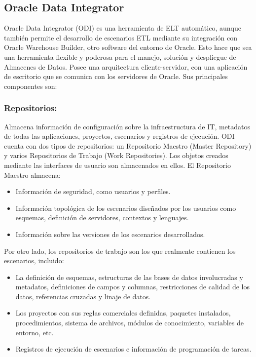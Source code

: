 \subsection{Oracle Data Integrator}

Oracle Data Integrator (ODI) es una herramienta de ELT automático, aunque también permite el desarrollo de escenarios 
ETL mediante su integración con Oracle Warehouse Builder, otro software del entorno de Oracle. Esto hace que sea una 
herramienta flexible y poderosa para el manejo, solución y despliegue de Almacenes de Datos. Posee una arquitectura 
cliente-servidor, con una aplicación de escritorio que se comunica con los servidores de Oracle. Sus principales 
componentes son: 

\subsubsection{Repositorios:} 
Almacena información de configuración sobre la infraestructura de IT, metadatos de todas las aplicaciones, proyectos, 
escenarios y registros de ejecución. ODI cuenta con dos tipos de repositorios: un Repositorio Maestro (Master Repository) 
y varios Repositorios de Trabajo (Work Repositories). Los objetos creados mediante las interfaces de usuario son almacenados 
en ellos. El Repositorio Maestro almacena:

\begin{itemize}
    \item Información de seguridad, como usuarios y perfiles.
    \item Información topológica de los escenarios diseñados por los usuarios como esquemas, definición de servidores, 
        contextos y lenguajes.
    \item Información sobre las versiones de los escenarios desarrollados.
\end{itemize}

Por otro lado, los repositorios de trabajo son los que realmente 
contienen los escenarios, incluido: 

\begin{itemize}
    \item La definición de esquemas, estructuras de las bases de datos involucradas y metadatos, 
        definiciones de campos y columnas, restricciones de calidad de los datos, referencias cruzadas y linaje de datos.
    \item Los proyectos con sus reglas comerciales definidas, paquetes instalados, procedimientos, 
        sistema de archivos, módulos de conocimiento, variables de entorno, etc.
    \item Registros de ejecución de escenarios e información de programación de tareas.
\end{itemize}

